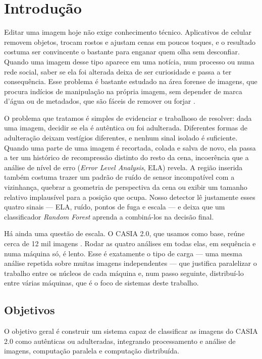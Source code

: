 \documentclass[12pt]{article}
\begin{document}
\section{Introdução}

Editar uma imagem hoje não exige conhecimento técnico. Aplicativos de celular
removem objetos, trocam rostos e ajustam cenas em poucos toques, e o resultado
costuma ser convincente o bastante para enganar quem olha sem desconfiar. Quando
uma imagem desse tipo aparece em uma notícia, num processo ou numa rede social,
saber se ela foi alterada deixa de ser curiosidade e passa a ter consequência.
Esse problema é bastante estudado na área forense de imagens, que procura
indícios de manipulação na própria imagem, sem depender de marca d'água ou de
metadados, que são fáceis de remover ou forjar \cite{farid2009,birajdar2013}.

O problema que tratamos é simples de evidenciar e trabalhoso de resolver: dada
uma imagem, decidir se ela é autêntica ou foi adulterada. Diferentes formas de
adulteração deixam vestígios diferentes, e nenhum sinal isolado é suficiente.
Quando uma parte de uma imagem é recortada, colada e salva de novo, ela passa a
ter um histórico de recompressão distinto do resto da cena, incoerência que a
análise de nível de erro (\textit{Error Level Analysis}, ELA) revela. A região
inserida também costuma trazer um padrão de ruído de sensor incompatível com a
vizinhança, quebrar a geometria de perspectiva da cena ou exibir um tamanho
relativo implausível para a posição que ocupa. Nosso detector lê justamente
esses quatro sinais --- ELA, ruído, pontos de fuga e escala --- e deixa que um
classificador \textit{Random Forest} aprenda a combiná-los na decisão final.

Há ainda uma questão de escala. O CASIA 2.0, que usamos como base, reúne cerca
de 12 mil imagens \cite{dong2013casia}. Rodar as quatro análises em todas elas,
em sequência e numa máquina só, é lento. Esse é exatamente o tipo de carga ---
uma mesma análise repetida sobre muitas imagens independentes --- que justifica
paralelizar o trabalho entre os núcleos de cada máquina e, num passo seguinte,
distribuí-lo entre várias máquinas, que é o foco de sistemas deste trabalho.

\subsection{Objetivos}

O objetivo geral é construir um sistema capaz de classificar as imagens do CASIA
2.0 como autênticas ou adulteradas, integrando processamento e análise de
imagens, computação paralela e computação distribuída.
\end{document}
